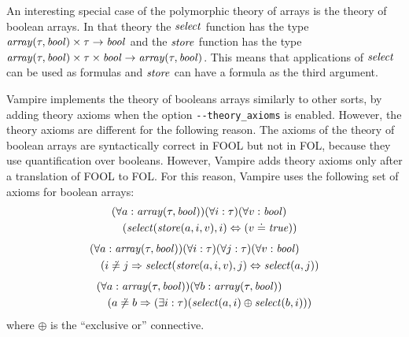 An interesting special case of the polymorphic theory of arrays is the theory of boolean arrays. In that theory the $\mathit{select}$ function has the type $\mathit{array}(\tau,\mathit{bool}) \times \tau \to \mathit{bool}$ and the $\mathit{store}$ function has the type $\mathit{array}(\tau,\mathit{bool}) \times \tau \times \mathit{bool} \to \mathit{array}(\tau,\mathit{bool})$. This means that applications of $\mathit{select}$ can be used as formulas and $\mathit{store}$ can have a formula as the third argument.

Vampire implements the theory of booleans arrays similarly to other sorts, by adding theory axioms when the option \verb'--theory_axioms' is enabled. However, the theory axioms are different for the following reason. The axioms of the theory of boolean arrays are syntactically correct in FOOL but not in FOL, because they use quantification over booleans. However, Vampire adds theory axioms only after a translation of FOOL to FOL. For this reason, Vampire uses the following set of axioms for boolean arrays:
\begin{equation*}
  \begin{aligned}
    &(\forall a:\mathit{array}(\tau,\mathit{bool}))(\forall i:\tau)(\forall v:\mathit{bool})\\
    &\quad(\mathit{select}({\mathit{store}({a},\allowbreak{i},\allowbreak{v})},\allowbreak{i}) \Leftrightarrow (v \doteq \mathit{true}))
  \end{aligned}
\end{equation*}
\begin{equation*}
  \begin{aligned}
    &(\forall a:\mathit{array}(\tau,\mathit{bool}))(\forall i:\tau)(\forall j:\tau)(\forall v:\mathit{bool})\\
    &\quad(i \not\doteq j \Rightarrow \mathit{select}({\mathit{store}({a},\allowbreak{i},\allowbreak{v})},\allowbreak{j}) \Leftrightarrow \mathit{select}({a},\allowbreak{j}))
  \end{aligned}
\end{equation*}
\begin{equation*}
  \begin{aligned}
    &(\forall a:\mathit{array}(\tau,\mathit{bool}))(\forall b:\mathit{array}(\tau,\mathit{bool}))\\
    &\quad(a \not\doteq b \Rightarrow (\exists i:\tau)(\mathit{select}({a},\allowbreak{i}) \oplus \mathit{select}({b},\allowbreak{i})))
  \end{aligned}
\end{equation*}
where $\oplus$ is the ``exclusive or'' connective.

\newcommand{\encrypt}{\mathit{encrypt}}
\newcommand{\key}{\mathit{key}}
\newcommand{\msg}{\mathit{message}}
\newcommand{\plaintext}{\mathit{plaintext}}
\newcommand{\cipher}{\mathit{cipher}}

